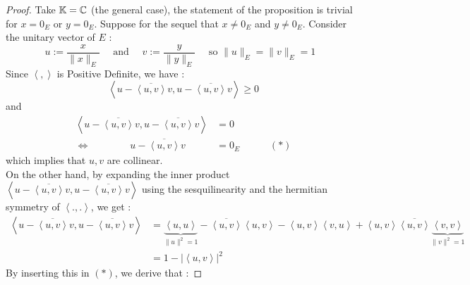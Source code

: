 % 
% 

\lecday[2025-05-22]

% 

\begin{proof}
Take $\mathbb{K} = \mathbb{C}  $ (the general case), the statement of the proposition
is trivial for $x = 0_{E} $ or $y = 0_{E} $. Suppose for 
the sequel that $x \neq 0_{E} $  and $y \neq 0_{E} $. Consider
the unitary vector of $E $ : 
\[
u := \frac{x}{\| x \| _{E}} \quad 
\text{ and } \quad 
v := \frac{y}{\| y \| _{E}}  \quad \text{ so $\| u \|_{E} = \| v \|_{E} =1 $ } 
\]
Since $\left\langle , \right\rangle $ is Positive Definite, we have : 
\[
\left\langle 
  u - \overline{\left\langle u,v \right\rangle } v, 
  u - \overline{\left\langle u,v \right\rangle } v
\right\rangle  \geq 0
\]
and 
\begin{align*}
\left\langle u - \overline{\left\langle u,v \right\rangle } v,
u - \overline{\left\langle u,v \right\rangle } v\right\rangle  &= 0 \\
\iff \quad \quad \quad \quad  u - \overline{\left\langle u,v \right\rangle } v &= 0_{E} \quad 
\quad  \quad (*)  
\end{align*}
which implies that $u,v $ are collinear. \\
On the other hand, by expanding the inner product 
$
\left\langle 
  u-\overline{\left\langle u,v \right\rangle } v, 
  u- \overline{\left\langle u,v \right\rangle } v
\right\rangle$
using the sesquilinearity and the hermitian symmetry 
of $\left\langle . , . \right\rangle  $, we get : 
\begin{align*}
\left\langle u - \overline{\left\langle u,v \right\rangle } v, 
u - \overline{\left\langle u,v \right\rangle } v \right\rangle  &= 
\underbrace{
\left\langle u,u \right\rangle
}_{\| u \| ^2  = 1} 
- \overline{\left\langle u,v \right\rangle } 
\left\langle u,v \right\rangle  - 
\left\langle u,v \right\rangle  \left\langle  v,u \right\rangle  + 
\left\langle u,v \right\rangle  \overline{\left\langle u,v \right\rangle } 
\underbrace{
\left\langle v,v \right\rangle 
}_{ \| v \| ^2  = 1} 
\\
                                                                &= 
                                                                1 - \left| 
                                                                \left\langle u,v \right\rangle 
                                                                \right|^2 
\end{align*}
By inserting this in $(*)$, we derive that : 

\end{proof}
